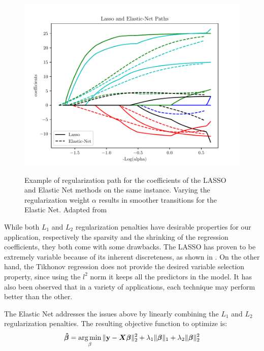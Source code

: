 \begin{figure}
  \caption{Example of regularization path for the coefficients of the LASSO and Elastic Net methods on the same instance. Varying the regularization weight $\alpha$ results in smoother transitions for the Elastic Net. Adapted from \cite{noauthor_lasso_nodate}}
  \centering
    \includegraphics[width=1\textwidth]{Figures/enet_vs_lasso.pdf}
  \label{fig:enet_vs_lasso}
\end{figure}

While both $L_1$ and $L_2$ regularization penalties have desirable properties for our application, respectively the sparsity and the shrinking of the regression coefficients, they both come with some drawbacks. The LASSO has proven to be extremely variable because of its inherent discreteness, as shown in \cite{breiman_heuristics_1996}. On the other hand, the Tikhonov regression does not provide the desired variable selection property, since using the $l^2$ norm it keeps all the predictors in the model. It has also been observed that in a variety of applications, each technique may perform better than the other.

The Elastic Net addresses the issues above by linearly combining the $L_1$ and $L_2$ regularization penalties. The resulting objective function to optimize is:
\begin{equation*}
    \boldsymbol{\hat{\beta}} = \operatorname*{arg\,min}_{\beta}{\lVert\mathbf{y} - \boldsymbol{X}\boldsymbol{\beta}\rVert_2^2} + \lambda_1 \lVert\boldsymbol{\beta}\rVert_1 + \lambda_2\lVert\boldsymbol{\beta}\rVert_2^2
\end{equation*}

